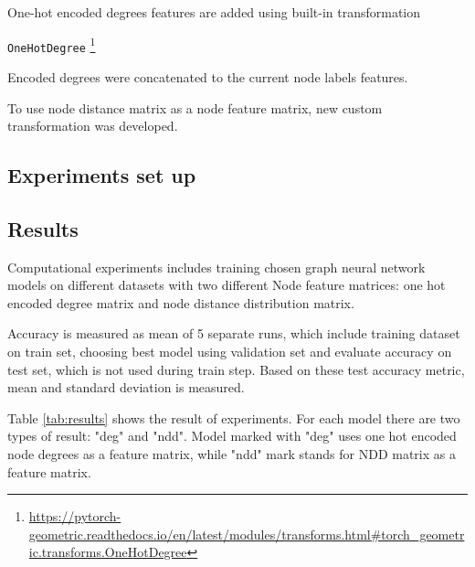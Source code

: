One-hot encoded degrees features are added using built-in transformation

\texttt{OneHotDegree}
\footnote{\url{https://pytorch-geometric.readthedocs.io/en/latest/modules/transforms.html\#torch_geometric.transforms.OneHotDegree}}

Encoded degrees were concatenated to the current node labels features.

To use node distance matrix as a node feature matrix, new custom transformation was developed.


\subsection{Experiments set up}




\subsection{Results}

Computational experiments includes training chosen graph neural network models on different datasets with two different
Node feature matrices: one hot encoded degree matrix and node distance distribution matrix.

Accuracy is measured as mean of 5 separate runs, which include training dataset on train set, choosing
best model using validation set and evaluate accuracy on test set, which is not used during train step.
Based on these test accuracy metric, mean and standard deviation is measured.

Table \ref{tab:results} shows the result of experiments. For each model there are two types of result: "deg" and "ndd".
Model marked with "deg" uses one hot encoded node degrees as a feature matrix, while "ndd" mark stands for NDD matrix 
as a feature matrix.

